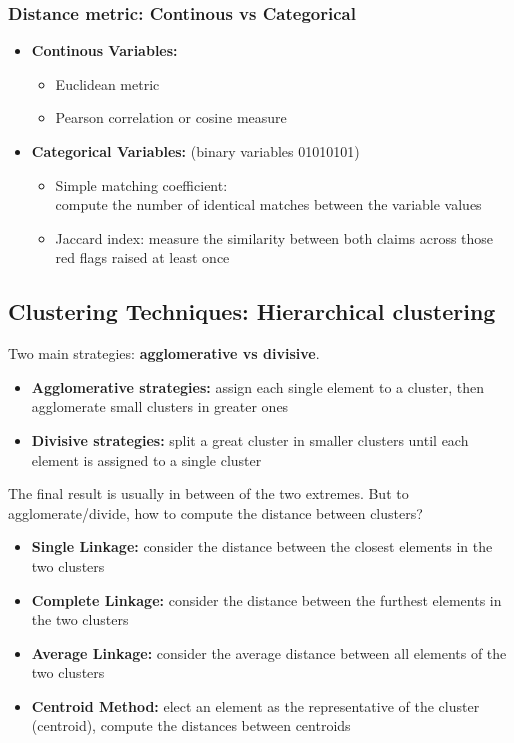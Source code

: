     \subsubsection{Distance metric: Continous vs Categorical}
        \begin{itemize}
            \item \textbf{Continous Variables:}
            \begin{itemize}
                \item Euclidean metric 
                \item Pearson correlation or cosine measure
            \end{itemize}
            \item \textbf{Categorical Variables:} (binary variables 01010101)
            \begin{itemize}
                \item Simple matching coefficient:\\ compute the number of identical matches between the variable values
                \item Jaccard index: measure the similarity between both claims across those red flags raised at least once
            \end{itemize}
        \end{itemize}
\subsection{Clustering Techniques: Hierarchical clustering}
    Two main strategies: \textbf{agglomerative vs divisive}.
    \begin{itemize}
        \item \textbf{Agglomerative strategies:} assign each single element to a cluster, then agglomerate small clusters in greater ones
        \item \textbf{Divisive strategies:} split a great cluster in smaller clusters until each element is assigned to a single cluster
    \end{itemize}
    The final result is usually in between of the two extremes. But to agglomerate/divide, how to compute the distance between clusters?
    \begin{itemize}
        \item \textbf{Single Linkage:} consider the distance between the closest elements in the two clusters 
        \item \textbf{Complete Linkage:} consider the distance between the furthest elements in the two clusters
        \item \textbf{Average Linkage:} consider the average distance between all elements of the two clusters
        \item \textbf{Centroid Method:} elect an element as the representative of the cluster (centroid), compute the distances between centroids
    \end{itemize}
